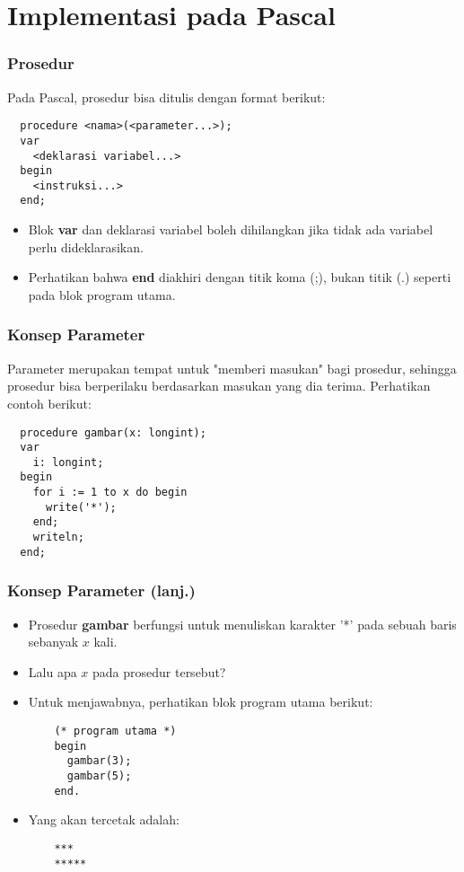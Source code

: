 \documentclass{beamer}
\begin{document}
\section{Implementasi pada Pascal}
\frame{\sectionpage}

\begin{frame}[fragile]
\frametitle{Prosedur}
Pada Pascal, prosedur bisa ditulis dengan format berikut:
\begin{lstlisting}
  procedure <nama>(<parameter...>);
  var
    <deklarasi variabel...>
  begin
    <instruksi...>
  end;
\end{lstlisting}
\begin{itemize}
  \item Blok \textbf{var} dan deklarasi variabel boleh dihilangkan jika tidak ada variabel perlu dideklarasikan.
  \item Perhatikan bahwa \textbf{end} diakhiri dengan titik koma (;), bukan titik (.) seperti pada blok program utama.
\end{itemize}
\end{frame}

\begin{frame}[fragile]
\frametitle{Konsep Parameter}
Parameter merupakan tempat untuk "memberi masukan" bagi prosedur, sehingga prosedur bisa berperilaku berdasarkan masukan yang dia terima.
\vfill
Perhatikan contoh berikut:
\begin{lstlisting}
  procedure gambar(x: longint);
  var
    i: longint;
  begin
    for i := 1 to x do begin
      write('*');
    end;
    writeln;
  end;
\end{lstlisting}
\end{frame}

\begin{frame}[fragile]
\frametitle{Konsep Parameter (lanj.)}
\begin{itemize}
  \item Prosedur \textbf{gambar} berfungsi untuk menuliskan karakter '*' pada sebuah baris sebanyak $x$ kali.
  \item Lalu apa $x$ pada prosedur tersebut?
  \item Untuk menjawabnya, perhatikan blok program utama berikut:
  \begin{lstlisting}
    (* program utama *)
    begin
      gambar(3);
      gambar(5);
    end.
  \end{lstlisting}
  \item Yang akan tercetak adalah:
  \begin{lstlisting}
    ***
    *****
  \end{lstlisting}
\end{itemize}
\end{frame}
\end{document}
